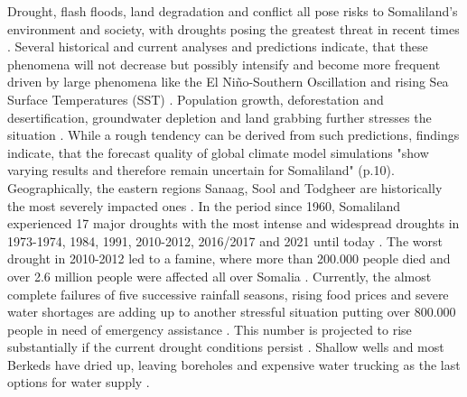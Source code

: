 Drought, flash floods, land degradation and conflict all pose risks to Somaliland's environment and society, with droughts posing the greatest threat in recent times \autocite{abdulkadirAssessmentDroughtRecurrence2017}. Several historical and current analyses and predictions indicate, that these phenomena will not decrease but possibly intensify and become more frequent driven by large phenomena like the El Niño-Southern Oscillation and rising Sea Surface Temperatures (SST) \autocite{abdulkadirAssessmentDroughtRecurrence2017,aliMitigatingNaturalDisasters2017a, balintMonitoringDroughtCombined2013, erianGARSpecialReport2021, faoswalimSomaliaWaterLand, museiSPEIbasedSpatialTemporal2021, nationaldroughtcommitteeSomalilandDroughtRapid2022,trisosAfrica2022}. Population growth, deforestation and desertification, groundwater depletion and land grabbing further stresses the situation \autocite{aliMitigatingNaturalDisasters2017a}. While a rough tendency can be derived from such predictions, \textcite{abdulkadirAssessmentDroughtRecurrence2017} findings indicate, that the forecast quality of global climate model simulations "show varying results and therefore remain uncertain for Somaliland" (p.10).\newline
Geographically, the eastern regions Sanaag, Sool and Todgheer are historically the most severely impacted ones \autocite{abdulkadirAssessmentDroughtRecurrence2017, faoswalimSomaliaWaterLand}. In the period since 1960, Somaliland experienced 17 major droughts with the most intense and widespread droughts in 1973-1974, 1984, 1991, 2010-2012, 2016/2017 and 2021 until today \autocite{abdulkadirAssessmentDroughtRecurrence2017, credEMDATInternationalDisasters2023}. The worst drought in 2010-2012 led to a famine, where more than 200.000 people died and over 2.6 million people were affected all over Somalia \autocite{srcsDRMStrategicPlan2021}.\newline
Currently, the almost complete failures of five successive rainfall seasons, rising food prices and severe water shortages are adding up to another stressful situation putting over 800.000 people in need of emergency assistance \autocite{nationaldroughtcommitteeSomalilandDroughtRapid2022}. This number is projected to rise substantially if the current drought conditions persist \autocite{swansonNearlyMillionPeople2022}. Shallow wells and most Berkeds have dried up, leaving boreholes and expensive water trucking as the last options for water supply \autocite{nationaldroughtcommitteeSomalilandDroughtRapid2022}.\newline

